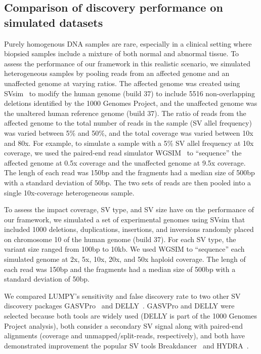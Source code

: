 \documentclass[10pt]{bmc_article}
\newenvironment{bmcformat}{\begin{raggedright}\baselineskip20pt\sloppy\setboolean{publ}{false}}{\end{raggedright}\baselineskip20pt\sloppy}
\begin{document}
\begin{bmcformat}
\subsection*{Comparison of discovery performance on simulated datasets}
Purely homogenous DNA samples are rare, especially in a clinical setting where
biopsied samples include a mixture of both normal and abnormal tissue.  To
assess the performance of our framework in this realistic scenario, we simulated
heterogeneous samples by pooling reads from an affected genome and an unaffected
genome at varying ratios.  The affected genome was created using
SVsim~\cite{faustunpub} to modify the human genome (build 37) to include
5516 non-overlapping deletions identified by the 1000 Genomes Project, and the
unaffected genome was the unaltered human reference genome (build 37).  The
ratio of reads from the affected genome to the total number of reads in the
sample (SV allel frequency) was varied between 5\% and 50\%, and the total
coverage was varied between 10x and 80x.  For example, to simulate a sample with
a 5\% SV allel frequency at 10x coverage, we used the paired-end read simulator
WGSIM~\cite{liunpub} to “sequence” the affected genome at 0.5x coverage and the
unaffected genome at 9.5x coverage.  The lengh of each read was 150bp and the
fragments had a median size of 500bp with a standard deviation of 50bp.  The two
sets of reads are then pooled into a single 10x-coverage heterogeneous sample.

To assess the impact coverage, SV type, and SV size have on the performance of
our framework, we simulated a set of experimental genomes using SVsim that
included 1000 deletions, duplications, insertions, and inversions randomly
placed on chromosome 10 of the human genome (build 37).  For each SV type, 
the variant size ranged from 100bp to 10kb.  We used WGSIM to “sequence” each
simulated genome at 2x, 5x, 10x, 20x, and 50x haploid coverage.  The lengh of
each read was 150bp and the fragments had a median size of 500bp with a standard
deviation of 50bp.

We compared LUMPY’s sensitivity and false discovery rate to two other SV
discovery packages GASVPro~\cite{sindi2012} and DELLY~\cite{rausch2012b}.
GASVPro and DELLY were selected because both tools are widely used (DELLY is
part of the 1000 Genomes Project analysis), both consider a secondary SV signal
along with paired-end alignments (coverage and unmapped/split-reads,
respectively), and both have demonstrated improvement the popular SV tools
Breakdancer~\cite{chen2009} and HYDRA~\cite{quinlan2010b}. 



\end{bmcformat}
\end{document}
